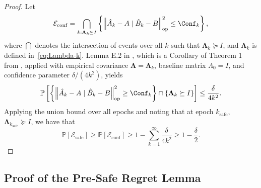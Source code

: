 \documentclass[11pt,journal,onecolumn]{IEEEtran}
\newcommand{\safe}{\mathrm{safe}}
\begin{document}
\begin{proof}
    Let
    \begin{equation}
        \mathcal{E}_{\mathrm{conf}} = \bigcap_{k: \mathbf{\Lambda}_k \succeq I} \left\{ \left\| \hat A_k - A \mid \hat B_k - B \right\|_{\text{op}}^2 \leq \Conf_k \right \},
    \end{equation}
    where $\bigcap$ denotes the intersection of events over all $k$ such that $\mathbf{\Lambda}_k \succeq I$, and $\mathbf{\Lambda}_k$ is defined in~\eqref{eq:Lambda-k}.
    Lemma E.2 in \cite{simchowitz20a}, which is a Corollary of Theorem 1 from \cite{abbasi}, applied with empirical covariance $\mathbf{\Lambda}=\mathbf{\Lambda}_k$, baseline matrix $\Lambda_0 = I$, and confidence parameter $\delta/(4k^2)$, yields
    \begin{equation}
        \mathbb{P} \left[ \left\{ \left\| \hat A_k - A \mid \hat B_k - B \right\|_{\text{op}}^2 \geq \Conf_k \right\} \cap \left\{ \mathbf{\Lambda}_k \succeq I \right\} \right] \leq \frac{\delta}{4k^2}.
    \end{equation}
    Applying the union bound over all epochs and noting that at epoch $k_\safe$, $\mathbf{\Lambda}_{k_\safe} \succeq I$, we have that
    \begin{equation}
        \mathbb{P}[\mathcal{E}_\safe] \geq  \mathbb{P} \left[ \mathcal{E}_{\mathrm{conf}} \right] \geq  1 - \sum_{k=1}^\infty \frac{\delta}{4k^2} \geq 1 - \frac{\delta}{2}.
    \end{equation}
\end{proof}

\subsection{Proof of the Pre-Safe Regret Lemma}
\end{document}
